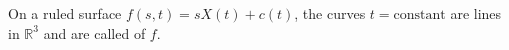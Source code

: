 On a ruled surface $f(s, t) = s X(t) + c(t)$, the curves $t = \text{constant}$ are lines in $\mathbb{R}^3$ and are called  of $f$.
